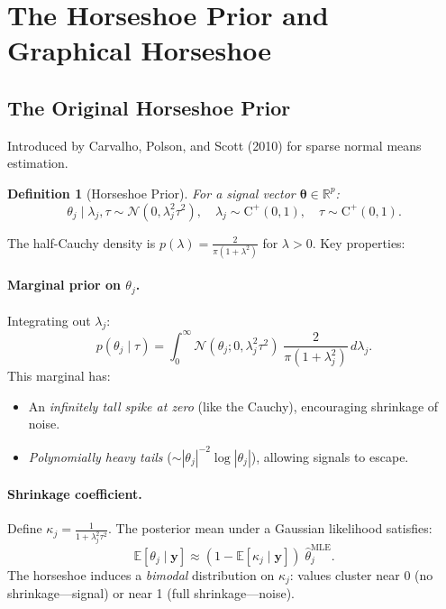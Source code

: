 \documentclass[11pt,a4paper]{article}
\newtheorem{definition}[theorem]{Definition}
\newcommand{\R}{\mathbb{R}}
\newcommand{\E}{\mathbb{E}}
\newcommand{\Normal}{\mathcal{N}}
\newcommand{\HalfCauchy}{\mathrm{C}^{+}}
\begin{document}
\section{The Horseshoe Prior and Graphical Horseshoe}\label{sec:horseshoe}

\subsection{The Original Horseshoe Prior}

Introduced by Carvalho, Polson, and Scott (2010) for sparse normal means estimation.

\begin{definition}[Horseshoe Prior]
For a signal vector $\bm{\theta} \in \R^p$:
\begin{equation}\label{eq:horseshoe}
  \theta_j \mid \lambda_j, \tau \sim \Normal(0, \lambda_j^2\tau^2), \quad
  \lambda_j \sim \HalfCauchy(0,1), \quad
  \tau \sim \HalfCauchy(0,1).
\end{equation}
\end{definition}

The half-Cauchy density is $p(\lambda) = \frac{2}{\pi(1+\lambda^2)}$ for $\lambda > 0$. Key properties:

\paragraph{Marginal prior on $\theta_j$.} Integrating out $\lambda_j$:
\begin{equation}
  p(\theta_j \mid \tau) = \int_0^\infty \Normal(\theta_j; 0, \lambda_j^2\tau^2)\;\frac{2}{\pi(1+\lambda_j^2)}\,d\lambda_j.
\end{equation}
This marginal has:
\begin{itemize}[nosep]
  \item An \emph{infinitely tall spike at zero} (like the Cauchy), encouraging shrinkage of noise.
  \item \emph{Polynomially heavy tails} ($\sim |\theta_j|^{-2}\log|\theta_j|$), allowing signals to escape.
\end{itemize}

\paragraph{Shrinkage coefficient.} Define $\kappa_j = \frac{1}{1 + \lambda_j^2\tau^2}$. The posterior mean under a Gaussian likelihood satisfies:
\begin{equation}
  \E[\theta_j \mid \bm{y}] \approx (1 - \E[\kappa_j \mid \bm{y}])\;\hat\theta_j^{\text{MLE}}.
\end{equation}
The horseshoe induces a \emph{bimodal} distribution on $\kappa_j$: values cluster near 0 (no shrinkage---signal) or near 1 (full shrinkage---noise).
\end{document}
